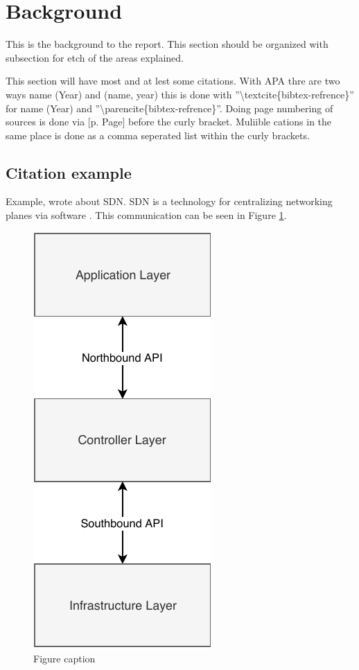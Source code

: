 
\section{Background}

This is the background to the report. This section should be organized with subsection for etch of the areas explained.

This section will have most and at lest some citations. With APA thre are two ways name (Year) and (name, year) this is done with ''\textbackslash textcite\{bibtex-refrence\}'' for name (Year) and ''\textbackslash parencite\{bibtex-refrence\}''. Doing page numbering of sources is done via [p. Page] before the curly bracket. Muliible cations in the same place is done as a comma seperated list within the curly brackets.




\subsection{Citation example}
Example, \textcite[p. 321]{ieeeSDN} wrote about SDN. SDN is a technology for centralizing networking planes via software \parencite[p. 123]{ieeeSDN, Roadto}. This communication can be seen in Figure \ref{figureRefenceName}.


\begin{figure}[h]
	\centering
	\includegraphics[width=0.25 \textwidth]{./pics/APIlayers.pdf}
	\caption{Figure caption}
    \label{figureRefenceName}
\end{figure}





